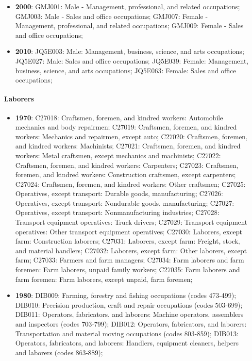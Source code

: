 \documentclass[a4paper]{article}
\begin{document}
\begin{itemize}
   \item{\textbf{2000}:  GMJ001: Male - Management, professional, and related occupations; GMJ003: Male - Sales and office occupations; GMJ007: Female - Management, professional, and related occupations; GMJ009: Female - Sales and office occupations;}
   \item{\textbf{2010}:  JQ5E003: Male: Management, business, science, and arts occupations; JQ5E027: Male: Sales and office occupations; JQ5E039: Female: Management, business, science, and arts occupations; JQ5E063: Female: Sales and office occupations;}
\end{itemize}

\paragraph{Laborers}
\begin{itemize}
   \item{\textbf{1970}:  C27018: Craftsmen, foremen, and kindred workers: Automobile mechanics and body repairmen; C27019: Craftsmen, foremen, and kindred workers: Mechanics and repairmen, except auto; C27020: Craftsmen, foremen, and kindred workers: Machinists; C27021: Craftsmen, foremen, and kindred workers: Metal craftsmen, except mechanics and machinists; C27022: Craftsmen, foremen, and kindred workers: Carpenters; C27023: Craftsmen, foremen, and kindred workers: Construction craftsmen, except carpenters; C27024: Craftsmen, foremen, and kindred workers: Other craftsmen; C27025: Operatives, except transport: Durable goods, manufacturing; C27026: Operatives, except transport: Nondurable goods, manufacturing; C27027: Operatives, except transport: Nonmanufacturing industries; C27028: Transport equipment operatives: Truck drivers; C27029: Transport equipment operatives: Other transport equipment operatives; C27030: Laborers, except farm: Construction laborers; C27031: Laborers, except farm: Freight, stock, and material handlers; C27032: Laborers, except farm: Other laborers, except farm; C27033: Farmers and farm managers; C27034: Farm laborers and farm foremen: Farm laborers, unpaid family workers; C27035: Farm laborers and farm foremen: Farm laborers, except unpaid, farm foremen;}
   \item{\textbf{1980}:  DIB009: Farming, forestry and fishing occupations (codes 473-499); DIB010: Precision production, craft and repair occupations (codes 503-699); DIB011: Operators, fabricators, and laborers: Machine operators, assemblers and inspectors (codes 703-799); DIB012: Operators, fabricators, and laborers: Transportation and material moving occupations (codes 803-859); DIB013: Operators, fabricators, and laborers: Handlers, equipment cleaners, helpers and laborers (codes 863-889);}

\end{itemize}
\end{document}
